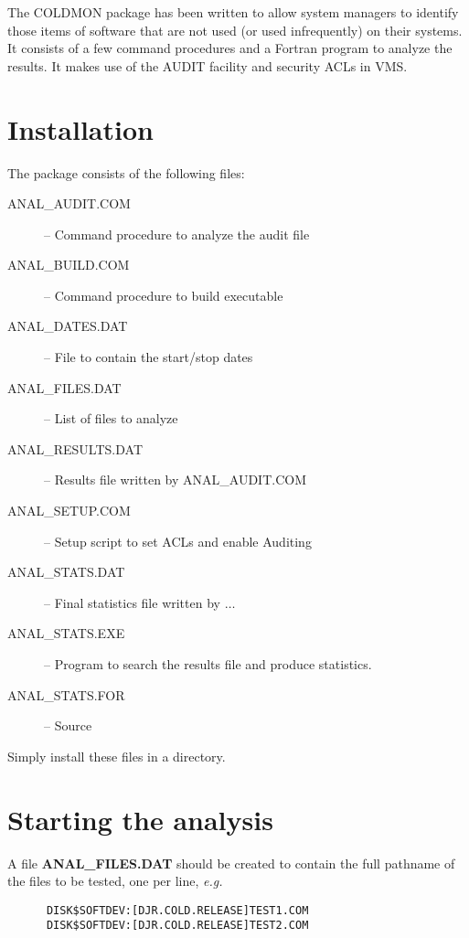 The COLDMON package has been written to allow system managers to identify those
items of software that are not used (or used infrequently) on their systems. It 
consists of a few command procedures and a Fortran program to analyze the
results. It makes use of the AUDIT facility and security ACLs in VMS.

\section{Installation}

The package consists of the following files:

\begin{description}
\begin{description}
\item [ANAL\_AUDIT.COM]  -- Command procedure to analyze the audit file
\item [ANAL\_BUILD.COM]  -- Command procedure to build executable
\item [ANAL\_DATES.DAT]  -- File to contain the start/stop dates
\item [ANAL\_FILES.DAT] -- List of files to analyze
\item [ANAL\_RESULTS.DAT]  -- Results file written by ANAL\_AUDIT.COM
\item [ANAL\_SETUP.COM]  -- Setup script to set ACLs and enable Auditing
\item [ANAL\_STATS.DAT]  -- Final statistics file written by $\ldots$
\item [ANAL\_STATS.EXE]  -- Program to search the results file and produce 
statistics.
\item [ANAL\_STATS.FOR]  -- Source
\end{description}
\end{description}

Simply install these files in a directory.

\section{Starting the analysis}

A file {\bf ANAL\_FILES.DAT} should be created to contain the full pathname of
the files to be tested, one per line, {\em e.g.}

\begin{verbatim}
      DISK$SOFTDEV:[DJR.COLD.RELEASE]TEST1.COM
      DISK$SOFTDEV:[DJR.COLD.RELEASE]TEST2.COM
\end{verbatim}


